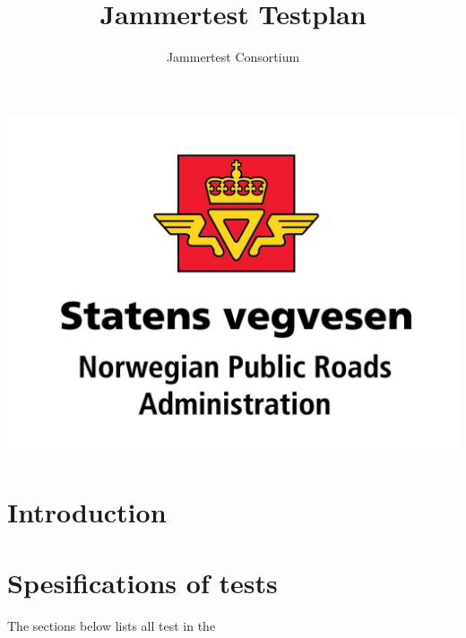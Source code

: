 \documentclass{article}
\title{Jammertest Testplan}
\author{Jammertest Consortium}
\date{ }
\begin{document}
\maketitle
\includegraphics[scale=0.1]{NPRA.png}

\tableofcontents

\section{Introduction}


\section{Spesifications of tests}
The sections below lists all test in the 

\end{document}
